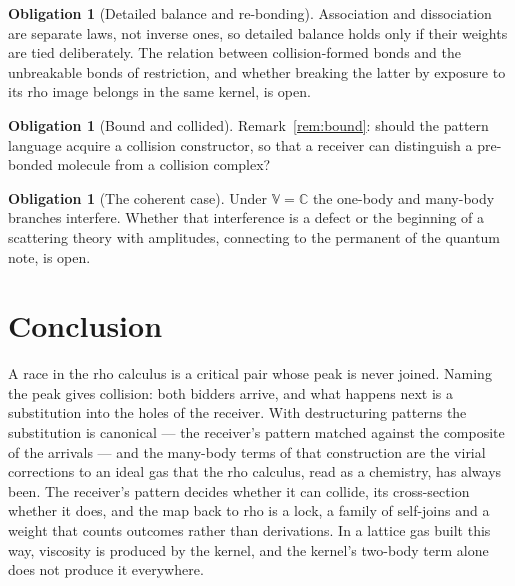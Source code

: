 \documentclass[11pt,a4paper]{article}
\theoremstyle{plain}
\theoremstyle{definition}
\newtheorem{obligation}[theorem]{Obligation}
\theoremstyle{remark}
\newcommand{\rhoc}{\textsf{rho}}
\newcommand{\V}{\mathbb{V}}
\newcommand{\Cx}{\mathbb{C}}
\begin{document}
\begin{obligation}[Detailed balance and re-bonding]\label{ob:balance}
Association and dissociation are separate laws, not inverse ones, so detailed
balance holds only if their weights are tied deliberately. The relation
between collision-formed bonds and the unbreakable bonds of restriction, and
whether breaking the latter by exposure to its \rhoc{} image belongs in the
same kernel, is open.
\end{obligation}

\begin{obligation}[Bound and collided]\label{ob:bound}
Remark~\ref{rem:bound}: should the pattern language acquire a collision
constructor, so that a receiver can distinguish a pre-bonded molecule from a
collision complex?
\end{obligation}

\begin{obligation}[The coherent case]\label{ob:coherent}
Under $\V=\Cx$ the one-body and many-body branches interfere. Whether that
interference is a defect or the beginning of a scattering theory with
amplitudes, connecting to the permanent of the quantum note, is open.
\end{obligation}

\section{Conclusion}\label{sec:conc}

A race in the \rhoc{} calculus is a critical pair whose peak is never joined.
Naming the peak gives collision: both bidders arrive, and what happens next is
a substitution into the holes of the receiver. With destructuring patterns the
substitution is canonical --- the receiver's pattern matched against the
composite of the arrivals --- and the many-body terms of that construction are
the virial corrections to an ideal gas that the \rhoc{} calculus, read as a
chemistry, has always been. The receiver's pattern decides whether it can
collide, its cross-section whether it does, and the map back to \rhoc{} is a
lock, a family of self-joins and a weight that counts outcomes rather than
derivations. In a lattice gas built this way, viscosity is produced by the
kernel, and the kernel's two-body term alone does not produce it everywhere.

\appendix
\end{document}
